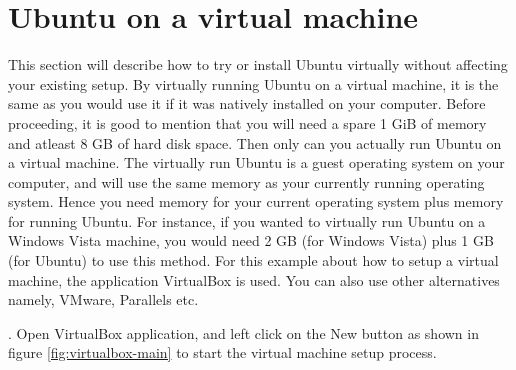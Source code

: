


\newpage
\section{Ubuntu on a virtual machine}
This section will describe how to try or install Ubuntu virtually without affecting your existing setup. By virtually running Ubuntu on a virtual machine, it is the same as you would use it if it was natively installed on your computer. Before proceeding, it is good to mention that you will need a spare 1 GiB of memory and atleast 8 GB of hard disk space. Then only can you actually run Ubuntu on a virtual machine. The virtually run Ubuntu is a guest operating system on your computer, and will use the same memory as your currently running operating system.  Hence you need memory for your current operating system plus memory for running Ubuntu. For instance, if you wanted to virtually run Ubuntu on a Windows Vista machine, you would need 2 GB (for Windows Vista) plus 1 GB (for Ubuntu) to use this method. For this example about how to setup a virtual machine, the application VirtualBox is used. You can  also use other alternatives namely, VMware, Parallels etc.  \\

\par {}. Open VirtualBox application, and left click on the New button as shown in figure \ref{fig:virtualbox-main} to start the virtual machine setup process. \\

